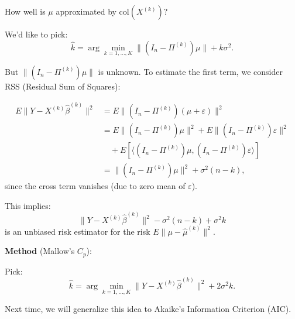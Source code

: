 \documentclass[open=any, 11pt,paper=A4]{scrreprt}
\begin{document}
How well is \(\mu\) approximated by \(\text{col}(X^{(k)})\)?

We'd like to pick:
\[
\hat{k}= \arg \min_{k= 1,\hdots,K}\| (I_n - \Pi^{(k)})\mu \| + k\sigma^2.
\]

But \(\|(I_n - \Pi^{(k)})\mu \|\) is unknown. To estimate the first term, we consider RSS (Residual Sum of Squares):

\begin{align*}
    E\| Y- X^{(k)}\hat{\beta}^{(k)}\|^2 &= E\| (I_n - \Pi^{(k)})(\mu+\varepsilon)\|^2\\ 
    &= E\| (I_n - \Pi^{(k)})\mu\|^2+ E\| (I_n - \Pi^{(k)})\varepsilon\|^2\\
    &\quad + E[\langle (I_n - \Pi^{(k)})\mu,(I_n - \Pi^{(k)})\varepsilon\rangle]\\ 
    &= \|(I_n - \Pi^{(k)}) \mu\|^2 + \sigma^2 (n-k),
\end{align*}
since the cross term vanishes (due to zero mean of \(\varepsilon\)).

This implies:
\[
\|Y- X^{(k)}\hat{\beta}^{(k)}\|^2 - \sigma^2 (n-k)+\sigma^2 k
\]
is an unbiased risk estimator for the risk \(E\|\mu -\hat{\mu}^{(k)}\|^2\).

\textbf{Method} (Mallow's $C_p$):

Pick:
\[
\hat{k}= \arg \min_{k =1,\hdots, K}\|Y-X^{(k)}\hat{\beta}^{(k)}\|^2+2\sigma^2 k.
\]

Next time, we will generalize this idea to Akaike's Information Criterion (AIC).













\iffalse


\appendix

\numberwithin{definition}{section}
\numberwithin{theorem}{section}
\numberwithin{proposition}{section}
\numberwithin{lemma}{section}
\numberwithin{corollary}{section}
\numberwithin{remark}{section}
\numberwithin{example}{section}
\numberwithin{supplement}{section}

\chapter{Appendix to the chapters} \label{ch:appendix}
\section{Introducing the problem}\label{sec: appendix to chap 1}

.....

\fi 

\medskip
\end{document}
